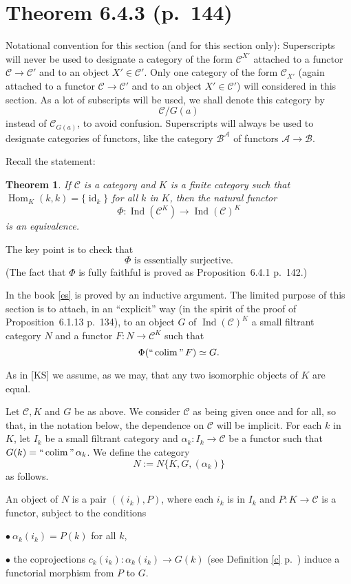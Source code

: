 \documentclass[12pt]{article}
\newtheorem{thm}{Theorem}
\theoremstyle{remark}%
\newcommand{\bu}{\bullet}
\newcommand{\n}{\noindent}
\newcommand{\A}{\mathcal A}
\newcommand{\B}{\mathcal B}
\newcommand{\C}{\mathcal C}
\newcommand{\be}{\begin{equation}}
\newcommand{\ee}{\end{equation}}
\newcommand{\pr}{Proposition}
\DeclareMathOperator*{\coli}{colim}
\DeclareMathOperator*{\ic}{``\coli"}
\DeclareMathOperator{\id}{id}
\DeclareMathOperator{\h}{Hom}
\DeclareMathOperator{\Ind}{Ind}
\begin{document}
\section{Theorem 6.4.3 (p.~144)} %
% 
Notational convention for this section (and for this section only): Superscripts will never be used to designate a category of the form $\C^{X'}$ attached to a functor $\C\to\C'$ and to an object $X'\in\C'$. Only one category of the form $\C_{X'}$ (again attached to a functor $\C\to\C'$ and to an object $X'\in\C'$) will considered in this section. As a lot of subscripts will be used, we shall denote this category by 
%
\be\label{slice}
\C/G(a)
\ee
%
instead of $\C_{G(a)}$, to avoid confusion. Superscripts will always be used to designate categories of functors, like the category $\B^\A$ of functors $\A\to\B$. 

Recall the statement: 
%
\begin{thm}
If $\C$ is a category and $K$ is a finite category such that $\h_K(k,k)=\{\id_k\}$ for all $k$ in $K$, then the natural functor 
$$
\Phi:\Ind(\C^K)\to\Ind(\C)^K
$$ 
is an equivalence.
\end{thm}
%

The key point is to check that 
%
\be\label{es} 
\Phi\text{ is essentially surjective.} 
\ee 
%
(The fact that $\Phi$ is fully faithful is proved as \pr\ 6.4.1 p.~142.) 

In the book \eqref{es} is proved by an inductive argument. The limited purpose of this section is to attach, in an ``explicit'' way (in the spirit of the proof of \pr\ 6.1.13 p.~134), to an object $G$ of $\Ind(\C)^K$ a small filtrant category $N$ and a functor $F:N\to\C^K$ such that 
$$ 
\Phi(\ic F)\simeq G. 
$$ 

As in [KS] we assume, as we may, that any two isomorphic objects of $K$ are equal. 

Let $\C,K$ and $G$ be as above. We consider $\C$ as being given once and for all, so that, in the notation below, the dependence on $\C$ will be implicit. For each $k$ in $K$, let $I_k$ be a small filtrant category and $\alpha_k:I_k\to\C$ be a functor such that $G(k)=\ic\alpha_k$. We define the category 
$$
N:=N\{K,G,(\alpha_k)\}
$$ 
as follows. 

An object of $N$ is a pair $((i_k),P)$, where each $i_k$ is in $I_k$ and $P:K\to\C$ is a functor, subject to the conditions 

\n$\bu\ \alpha_k(i_k)=P(k)$ for all $k$, 

\n$\bu$ the coprojections $c_k(i_k):\alpha_k(i_k)\to G(k)$ (see Definition \ref{c} p.~\pageref{c}) induce a functorial morphism from $P$ to $G$. 
\end{document}
